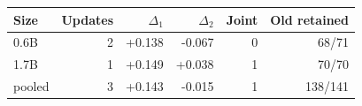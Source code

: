 \begin{tabular}{lrrrrr}\toprule
Size & Updates & $\Delta_1$ & $\Delta_2$ & Joint & Old retained\\\midrule
0.6B & 2 & +0.138 & -0.067 & 0 & 68/71\\
1.7B & 1 & +0.149 & +0.038 & 1 & 70/70\\
pooled & 3 & +0.143 & -0.015 & 1 & 138/141\\
\bottomrule\end{tabular}
